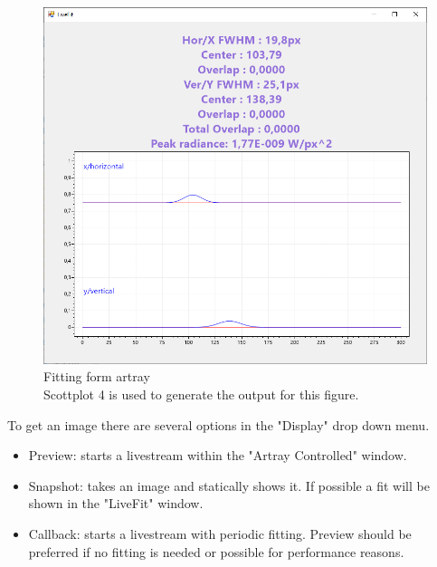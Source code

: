 \documentclass[twoside,openright]{scrreprt}
\begin{document}
\begin{figure}[hbtp]
\centering
\includegraphics[width = 0.6\linewidth]{images/ArtrayExamplePics/FittingForm.PNG}
\caption{Fitting form artray\\Scottplot 4 is used to generate the output for this figure.\label{fig:ArtrayFitting}}
\end{figure}


To get an image there are several options in the "Display" drop down menu.
\begin{itemize}
\item Preview: starts a livestream within the "Artray Controlled" window.
\item Snapshot: takes an image and statically shows it. If possible a fit will be shown in the "LiveFit" window.
\item Callback: starts a livestream with periodic fitting. Preview should be preferred if no fitting is needed or possible for performance reasons.
\end{itemize}
\end{document}
